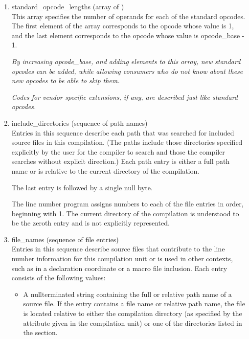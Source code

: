 \begin{enumerate}[1. ]
\item standard\_opcode\_lengths (array of ) \\
This array specifies the number of  operands for each
of the standard opcodes. The first element of the array
corresponds to the opcode whose value is 1, and the last
element corresponds to the opcode whose value 
is opcode\_base - 1.

\textit{By increasing opcode\_base, and adding elements to this array,
new standard opcodes can be added, while allowing consumers who
do not know about these new opcodes to be able to skip them.}

\textit{Codes for vendor specific extensions, if any, are described
just like standard opcodes.}

\item include\_directories (sequence of path names) \\
Entries 
in this sequence describe each path that was searched
for included source files in this compilation. (The paths
include those directories specified explicitly by the user for
the compiler to search and those the compiler searches without
explicit direction.) Each path entry is either a full path name
or is relative to the current directory of the compilation.

The last entry is followed by a single null byte.

The line number program assigns numbers to each of the file
entries in order, beginning with 1. The current directory of
the compilation is understood to be the zeroth entry and is
not explicitly represented.

\item  file\_names (sequence of file entries) \\
Entries 
in 
this sequence describe source files that contribute
to the line number information for this compilation unit or is
used in other contexts, such as in a declaration coordinate or
a macro file inclusion. Each entry consists of the following
values:


\begin{itemize}
\item A null\dash terminated string containing the full or relative
path name of a source file. If the entry contains a file
name or relative path name, the file is located relative
to either the compilation directory (as specified by the
attribute given in the compilation unit) or one
of the directories listed in the 
 section.


\end{itemize}
\end{enumerate}
